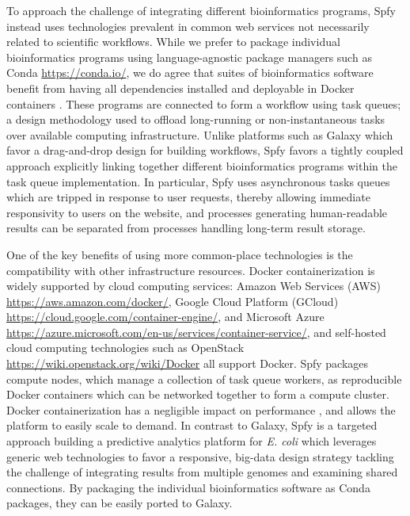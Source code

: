 \documentclass{article}
\begin{document}
To approach the challenge of integrating different bioinformatics programs, Spfy instead uses technologies prevalent in common web services not necessarily related to scientific workflows.
While we prefer to package individual bioinformatics programs using language-agnostic package managers such as Conda \url{https://conda.io/}, we do agree that suites of bioinformatics software benefit from having all dependencies installed and deployable in Docker containers \cite{di2015impact}.
These programs are connected to form a workflow using task queues; a design methodology used to offload long-running or non-instantaneous tasks over available computing infrastructure.
Unlike platforms such as Galaxy which favor a drag-and-drop design for building workflows, Spfy favors a tightly coupled approach explicitly linking together different bioinformatics programs within the task queue implementation.
In particular, Spfy uses asynchronous tasks queues which are tripped in response to user requests, thereby allowing immediate responsivity to users on the website, and processes generating human-readable results can be separated from processes handling long-term result storage.

One of the key benefits of using more common-place technologies is the compatibility with other infrastructure resources.
Docker containerization is widely supported by cloud computing services: Amazon Web Services (AWS) \url{https://aws.amazon.com/docker/}, Google Cloud Platform (GCloud) \url{https://cloud.google.com/container-engine/}, and Microsoft Azure \url{https://azure.microsoft.com/en-us/services/container-service/}, and self-hosted cloud computing technologies such as OpenStack \url{https://wiki.openstack.org/wiki/Docker} all support Docker.
Spfy packages compute nodes, which manage a collection of task queue workers, as reproducible Docker containers which can be networked together to form a compute cluster.
Docker containerization has a negligible impact on performance \cite{di2015impact}, and allows the platform to easily scale to demand.
In contrast to Galaxy, Spfy is a targeted approach building a predictive analytics platform for \textit{E. coli} which leverages generic web technologies to favor a responsive, big-data design strategy tackling the challenge \cite{fricke2014bacterial} of integrating results from multiple genomes and examining shared connections.
By packaging the individual bioinformatics software as Conda packages, they can be easily ported to Galaxy.
\end{document}
